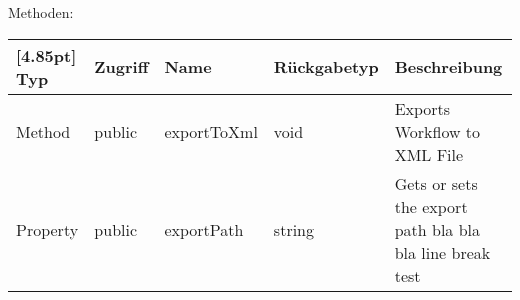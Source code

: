             Methoden:
            \begin{center}
	            \setlength\tabcolsep{5pt}
	            \renewcommand{\arraystretch}{1.5}
	            
                \begin{tabularx}{\textwidth}{|l|l|l|l|X|}
                    \hline
                    \rowcolor[gray]{0.75}[4.85pt]
                    Typ & Zugriff & Name & Rückgabetyp & Beschreibung \\ \hline 
                    Method & public & exportToXml & void & Exports Workflow to XML File \\ \hline
                    Property & public & exportPath & string & Gets or sets the export path bla bla bla line break test\\
                    \hline
                \end{tabularx}
            \end{center}
%                    

